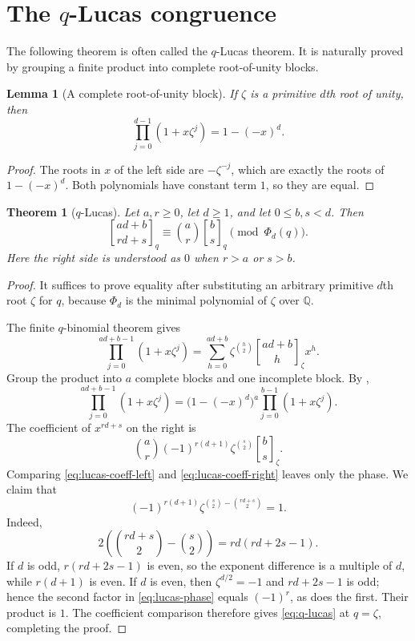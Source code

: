 \documentclass[11pt,oneside,openany]{book}
\newtheorem{theorem}{Theorem}[chapter]
\newtheorem{lemma}[lemma]{Lemma}
\theoremstyle{definition}
\theoremstyle{remark}
\newcommand{\Qbinom}[3]{\genfrac{[}{]}{0pt}{}{#1}{#2}_{#3}}
\newcommand{\Q}{\mathbb Q}
\begin{document}
\section{The \texorpdfstring{$q$}{q}-Lucas congruence}

The following theorem is often called the $q$-Lucas theorem.  It is naturally proved by grouping a finite product into complete root-of-unity blocks.

\begin{lemma}[A complete root-of-unity block]\label{lem:root-block}
If $\zeta$ is a primitive $d$th root of unity, then
\[
 \prod_{j=0}^{d-1}(1+x\zeta^j)=1-(-x)^d.
 \tag{16.3}\label{eq:root-block}
\]
\end{lemma}

\begin{proof}
The roots in $x$ of the left side are $-\zeta^{-j}$, which are exactly the roots of $1-(-x)^d$.  Both polynomials have constant term $1$, so they are equal.
\end{proof}

\begin{theorem}[$q$-Lucas]\label{thm:q-lucas}
Let $a,r\ge0$, let $d\ge1$, and let $0\le b,s<d$.  Then
\[
 \Qbinom{ad+b}{rd+s}{q}
 \equiv
 \binom ar\Qbinom bsq
 \pmod{\Phi_d(q)}.
 \tag{16.4}\label{eq:q-lucas}
\]
Here the right side is understood as $0$ when $r>a$ or $s>b$.
\end{theorem}

\begin{proof}
It suffices to prove equality after substituting an arbitrary primitive $d$th root $\zeta$ for $q$, because $\Phi_d$ is the minimal polynomial of $\zeta$ over $\Q$.

The finite $q$-binomial theorem gives
\[
 \prod_{j=0}^{ad+b-1}(1+x\zeta^j)
 =\sum_{h=0}^{ad+b}\zeta^{\binom h2}
   \Qbinom{ad+b}{h}{\zeta}x^h.
 \tag{16.5}\label{eq:lucas-coeff-left}
\]
Group the product into $a$ complete blocks and one incomplete block.  By ,
\[
 \prod_{j=0}^{ad+b-1}(1+x\zeta^j)
 =\bigl(1-(-x)^d\bigr)^a
   \prod_{j=0}^{b-1}(1+x\zeta^j).
\]
The coefficient of $x^{rd+s}$ on the right is
\[
 \binom ar(-1)^{r(d+1)}
 \zeta^{\binom s2}\Qbinom bs{\zeta}.
 \tag{16.6}\label{eq:lucas-coeff-right}
\]
Comparing \eqref{eq:lucas-coeff-left} and \eqref{eq:lucas-coeff-right} leaves only the phase.  We claim that
\[
 (-1)^{r(d+1)}
 \zeta^{\binom s2-\binom{rd+s}{2}}=1.
 \tag{16.7}\label{eq:lucas-phase}
\]
Indeed,
\[
 2\left(\binom{rd+s}{2}-\binom s2\right)
 =rd(rd+2s-1).
\]
If $d$ is odd, $r(rd+2s-1)$ is even, so the exponent difference is a multiple of $d$, while $r(d+1)$ is even.  If $d$ is even, then $\zeta^{d/2}=-1$ and $rd+2s-1$ is odd; hence the second factor in \eqref{eq:lucas-phase} equals $(-1)^r$, as does the first.  Their product is $1$.  The coefficient comparison therefore gives \eqref{eq:q-lucas} at $q=\zeta$, completing the proof.
\end{proof}
\end{document}
